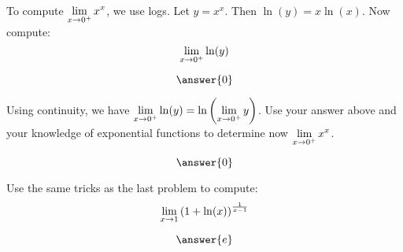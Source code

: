 \documentclass{ximera}
\begin{document}
    \begin{problem}
    To compute $\displaystyle \lim_{x \to 0^+} x^x$, we use logs. Let $y=x^x$. Then $\ln(y) = x \ln(x)$. Now compute:
    \[
        \displaystyle \lim_{x \to 0^+} \ln(y)
    \]


    $$\answer{0}$$


    Using continuity, we have $\displaystyle \lim_{x \to 0^+} \ln(y) = \ln\left(\displaystyle \lim_{x \to 0^+} y\right)$. Use your answer above and your knowledge of exponential functions to determine now $\displaystyle \lim_{x \to 0^+} x^x$.

    $$\answer{0}$$

    \end{problem}

    \begin{problem}
Use the same tricks as the last problem to compute:
        \[
            \displaystyle \lim_{x \to 1} \left(1+\ln(x)\right)^{\frac{1}{x-1}}
        \]

    $$\answer{e}$$
     \end{problem}
\end{document}
